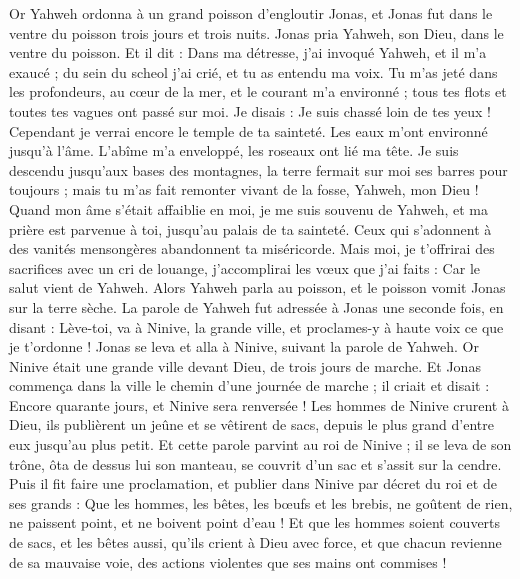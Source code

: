 \begin{multicols}{2}
\VerseOne{}Or Yahweh ordonna à un grand poisson d'engloutir Jonas, et Jonas fut dans le ventre du poisson trois jours et trois nuits.
Jonas pria Yahweh, son Dieu, dans le ventre du poisson.
Et il dit : Dans ma détresse, j'ai invoqué Yahweh, et il m'a exaucé ; du sein du scheol j'ai crié, et tu as entendu ma voix.
Tu m'as jeté dans les profondeurs, au cœur de la mer, et le courant m'a environné ; tous tes flots et toutes tes vagues ont passé sur moi.
Je disais : Je suis chassé loin de tes yeux ! Cependant je verrai encore le temple de ta sainteté.
Les eaux m'ont environné jusqu'à l'âme. L'abîme m'a enveloppé, les roseaux ont lié ma tête.
Je suis descendu jusqu'aux bases des montagnes, la terre fermait sur moi ses barres pour toujours ; mais tu m'as fait remonter vivant de la fosse, Yahweh, mon Dieu !
Quand mon âme s'était affaiblie en moi, je me suis souvenu de Yahweh, et ma prière est parvenue à toi, jusqu'au palais de ta sainteté.
Ceux qui s'adonnent à des vanités mensongères abandonnent ta miséricorde.
Mais moi, je t'offrirai des sacrifices avec un cri de louange, j'accomplirai les vœux que j'ai faits : Car le salut vient de Yahweh.
Alors Yahweh parla au poisson, et le poisson vomit Jonas sur la terre sèche.
\VerseOne{}La parole de Yahweh fut adressée à Jonas une seconde fois, en disant :
Lève-toi, va à Ninive, la grande ville, et proclames-y à haute voix ce que je t'ordonne !
Jonas se leva et alla à Ninive, suivant la parole de Yahweh. Or Ninive était une grande ville devant Dieu, de trois jours de marche.
Et Jonas commença dans la ville le chemin d'une journée de marche ; il criait et disait : Encore quarante jours, et Ninive sera renversée !
Les hommes de Ninive crurent à Dieu, ils publièrent un jeûne et se vêtirent de sacs, depuis le plus grand d'entre eux jusqu'au plus petit.
Et cette parole parvint au roi de Ninive ; il se leva de son trône, ôta de dessus lui son manteau, se couvrit d'un sac et s'assit sur la cendre.
Puis il fit faire une proclamation, et publier dans Ninive par décret du roi et de ses grands : Que les hommes, les bêtes, les bœufs et les brebis, ne goûtent de rien, ne paissent point, et ne boivent point d'eau !
Et que les hommes soient couverts de sacs, et les bêtes aussi, qu'ils crient à Dieu avec force, et que chacun revienne de sa mauvaise voie, des actions violentes que ses mains ont commises !

\end{multicols}
